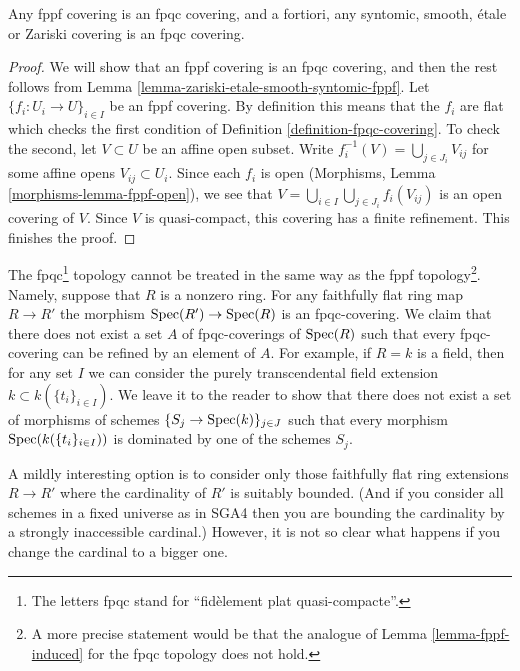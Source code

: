 \begin{lemma}
\label{lemma-zariski-etale-smooth-syntomic-fppf-fpqc}
Any fppf covering is an fpqc covering, and a fortiori,
any syntomic, smooth, \'etale or Zariski covering is an fpqc covering.
\end{lemma}

\begin{proof}
We will show that an fppf covering is an fpqc covering, and then the
rest follows from
Lemma \ref{lemma-zariski-etale-smooth-syntomic-fppf}.
Let $\{f_i : U_i \to U\}_{i \in I}$ be an fppf covering.
By definition this means that the $f_i$ are flat which checks the first
condition of Definition \ref{definition-fpqc-covering}. To check the
second, let $V \subset U$ be an affine open subset.
Write $f_i^{-1}(V) = \bigcup_{j \in J_i} V_{ij}$
for some affine opens $V_{ij} \subset U_i$. Since each $f_i$ is open
(Morphisms, Lemma \ref{morphisms-lemma-fppf-open}), we see that
$V = \bigcup_{i\in I} \bigcup_{j \in J_i} f_i(V_{ij})$
is an open covering of $V$.
Since $V$ is quasi-compact, this covering has a finite
refinement. This finishes the proof.
\end{proof}

\noindent
The fpqc\footnote{The letters fpqc stand for
``fid\`element plat quasi-compacte''.}
topology cannot be treated in the same way as the fppf
topology\footnote{A more precise statement would be that the analogue of
Lemma \ref{lemma-fppf-induced} for the fpqc topology does not hold.}.
Namely, suppose that $R$ is a nonzero ring. For any faithfully flat
ring map $R \to R'$ the morphism $\mathop{\rm Spec}(R') \to \mathop{\rm Spec}(R)$
is an fpqc-covering. We claim that there does not exist a set $A$ of
fpqc-coverings of $\mathop{\rm Spec}(R)$ such that every fpqc-covering can
be refined by an element of $A$. For example, if $R = k$ is a field,
then for any set $I$ we can consider the purely transcendental field extension
$k \subset k(\{t_i\}_{i \in I})$. We leave it to the reader to show
that there does not exist a set of morphisms of schemes
$\{S_j \to \mathop{\rm Spec}(k)\}_{j \in J}$ such that every morphism
$\mathop{\rm Spec}(k(\{t_i\}_{i \in I}))$ is dominated by one of
the schemes $S_j$.

\medskip\noindent
A mildly interesting option is to consider only those faithfully flat ring
extensions $R \to R'$ where the cardinality of $R'$ is suitably bounded.
(And if you consider all schemes in a fixed universe as in SGA4 then you
are bounding the cardinality by a strongly inaccessible cardinal.)
However, it is not so clear what happens if you change the cardinal
to a bigger one.

